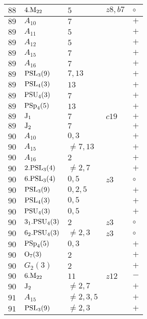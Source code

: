 \documentclass[a4paper, 11pt]{article}
\begin{document}
\begin{longtable}{lllll}
		$88$ & $4.{\rm M}_{22}$ & $5$ & $z8, b7$ & $\circ$ \\ \hline
		$89$ & $A_{10}$ & $7$ &  & $+$ \\ \hline
		$89$ & $A_{11}$ & $5$ &  & $+$ \\ \hline
		$89$ & $A_{12}$ & $5$ &  & $+$ \\ \hline
		$89$ & $A_{15}$ & $7$ &  & $+$ \\ \hline
		$89$ & $A_{16}$ & $7$ &  & $+$ \\ \hline
		$89$ & ${\rm PSL}_{3}(9)$ & $7,13$ &  & $+$ \\ \hline
		$89$ & ${\rm PSL}_{4}(3)$ & $13$ &  & $+$ \\ \hline
		$89$ & ${\rm PSU}_{4}(3)$ & $7$ &  & $+$ \\ \hline
		$89$ & ${\rm PSp}_{4}(5)$ & $13$ &  & $+$ \\ \hline
		$89$ & ${\rm J}_1$ & $7$ & $c19$ & $+$ \\ \hline
		$89$ & ${\rm J}_2$ & $7$ &  & $+$ \\ \hline
		$90$ & $A_{10}$ & $0,3$ &  & $+$ \\ \hline
		$90$ & $A_{15}$ & $\neq 7,13$ &  & $+$ \\ \hline
		$90$ & $A_{16}$ & $2$ &  & $+$ \\ \hline
		$90$ & $2.{\rm PSL}_{3}(4)$ & $\neq 2,7$ &  & $+$ \\ \hline
		$90$ & $6.{\rm PSL}_{3}(4)$ & $0,5$ & $z3$ & $\circ$ \\ \hline
		$90$ & ${\rm PSL}_{3}(9)$ & $0, 2, 5$ &  & $+$ \\ \hline
		$90$ & ${\rm PSL}_{4}(3)$ & $0,5$ &  & $+$ \\ \hline
		$90$ & ${\rm PSU}_{4}(3)$ & $0,5$ &  & $+$ \\ \hline
		$90$ & $3_1.{\rm PSU}_{4}(3)$ & $2$ & $z3$ & $\circ$ \\ \hline
		$90$ & $6_2.{\rm PSU}_{4}(3)$ & $\neq 2,3$ & $z3$ & $\circ$ \\ \hline
		$90$ & ${\rm PSp}_{4}(5)$ & $0,3$ &  & $+$ \\ \hline
		$90$ & ${\rm O}_{7}(3)$ & $2$ &  & $+$ \\ \hline
		$90$ & $G_{2}(3)$ & $2$ &  & $+$ \\ \hline
		$90$ & $6.{\rm M}_{22}$ & $11$ & $z12$ & $-$ \\ \hline
		$90$ & ${\rm J}_2$ & $\neq 2,7$ &  & $+$ \\ \hline
		$91$ & $A_{15}$ & $\neq 2,3,5$ &  & $+$ \\ \hline
		$91$ & ${\rm PSL}_{3}(9)$ & $\neq 2,3$ &  & $+$ \\ \hline

\end{longtable}
\end{document}
